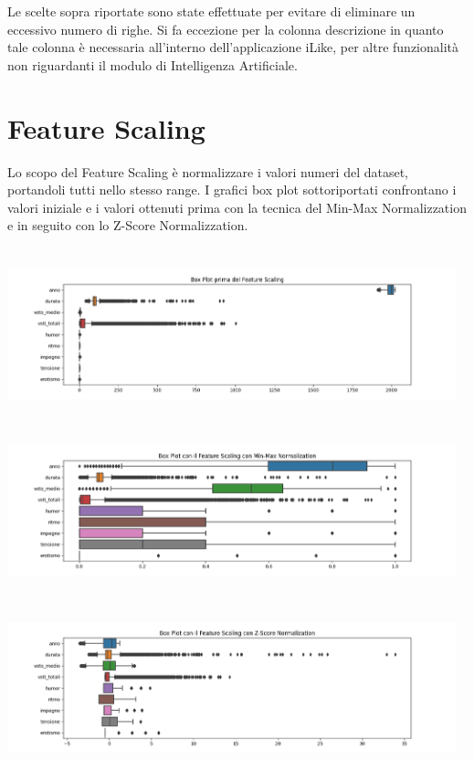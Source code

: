 \documentclass[a4paper, 10pt]{report}
\begin{document}
            Le scelte sopra riportate sono state effettuate per evitare di eliminare un eccessivo numero di righe.
            Si fa eccezione per la colonna descrizione in quanto tale colonna è necessaria all'interno dell'applicazione
            iLike, per altre funzionalità non riguardanti il modulo di Intelligenza Artificiale.

        \section{Feature Scaling}\label{sec:feature-scaling}
            Lo scopo del Feature Scaling è normalizzare i valori numeri del dataset, portandoli tutti nello stesso range.
            I grafici box plot sottoriportati confrontano i valori iniziale e i valori ottenuti prima con la tecnica del
            Min-Max Normalizzation e in seguito con lo Z-Score Normalizzation.

            \begin{center}
                \includegraphics[width=13cm, height=5cm]{dataPreparation/noScaling.png}\\
                \includegraphics[width=13cm, height=5cm]{dataPreparation/minMax.png}\\
                \includegraphics[width=13cm, height=5cm]{dataPreparation/zScore.png}\\
            \end{center}
\end{document}
